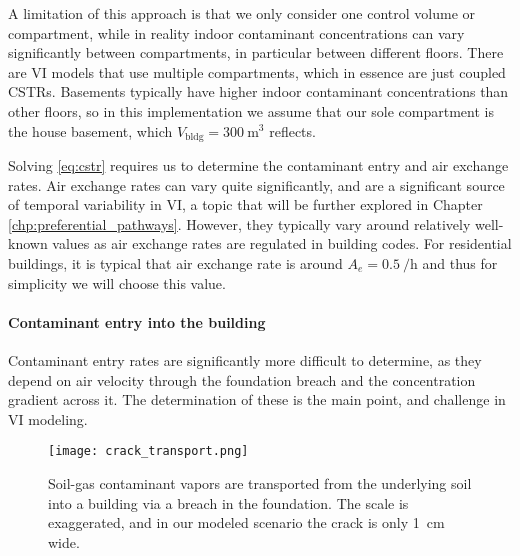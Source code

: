 A limitation of this approach is that we only consider one control volume or compartment, while in reality indoor contaminant concentrations can vary significantly between compartments, in particular between different floors.
There are VI models that use multiple compartments, which in essence are just coupled CSTRs\cite{murphy_multi-compartment_2011}.
Basements typically have higher indoor contaminant concentrations than other floors, so in this implementation we assume that our sole compartment is the house basement, which $V_\mathrm{bldg} = \SI{300}{\metre\cubed}$ reflects.\par

Solving \eqref{eq:cstr} requires us to determine the contaminant entry and air exchange rates.
Air exchange rates can vary quite significantly, and are a significant source of temporal variability in VI, a topic that will be further explored in Chapter \ref{chp:preferential_pathways}.
However, they typically vary around relatively well-known values as air exchange rates are regulated in building codes.
For residential buildings, it is typical that air exchange rate is around $A_e = \SI{0.5}{\per\hour}$ and thus for simplicity we will choose this value.\par

\paragraph{Contaminant entry into the building}

Contaminant entry rates are significantly more difficult to determine, as they depend on air velocity through the foundation breach and the concentration gradient across it.
The determination of these is the main point, and challenge in VI modeling.\par

\begin{figure}[htb!]
  \centering
  \texttt{[image: crack\_transport.png]}
  \caption[Schematic of soil-gas contaminant entry into a building through a breach in the foundation.]{Soil-gas contaminant vapors are transported from the underlying soil into a building via a breach in the foundation. The scale is exaggerated, and in our modeled scenario the crack is only \SI{1}{\centi\metre} wide.}
  \label{fig:crack_transport}
\end{figure}

